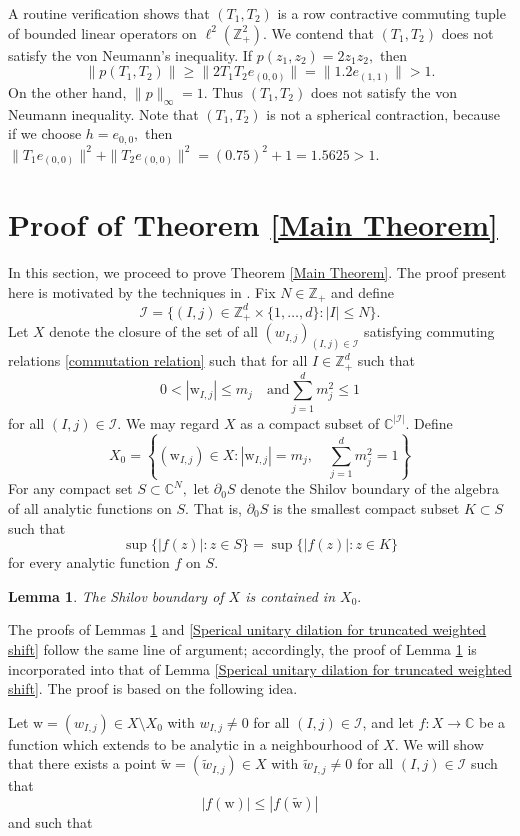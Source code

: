 \documentclass[12pt,reqno] {amsart}
\newtheorem{lemma}{Lemma}
\theoremstyle{remark}
\theoremstyle{definition}
\begin{document}
A routine verification shows that $(T_1,T_2)$ is a row contractive commuting tuple of bounded linear operators on $\ell^2(\mathbb Z_+^2).$
We contend that $(T_1,T_2)$ does not satisfy the von Neumann's inequality. If $p(z_1,z_2)= 2z_1 z_2,$ then
\[ \|p(T_1, T_2)\|\geq \|2T_1T_2e_{(0,0)}\| = \|1.2 e_{(1,1)}\| > 1. \] 
On the other hand, $\|p\|_{ \infty}=1$. Thus $(T_1,T_2)$ does not satisfy the von Neumann inequality. Note that $(T_1,T_2)$ is not a spherical contraction, because if we choose $h=e_{0,0},$ then $\|T_1e_{(0,0)}\|^2 +\| T_2e_{(0,0)}\|^2 = (0.75)^2+1 = 1.5625 > 1.$

\section{Proof of Theorem \ref{Main Theorem}}
In this section, we proceed to prove  Theorem \ref{Main Theorem}.
The proof present here is motivated by the techniques in \cite{Hz}.
Fix \( N \in \mathbb{Z}_+ \) and define
\[
\mathcal{I} = \{ (I,j) \in \mathbb{Z}_+^d \times \{1, \dots, d\} : |I| \leq N \}.
\]
Let \( X \) denote the closure of the set of all \( ({w}_{I,j})_{(I,j) \in \mathcal{I}} \) satisfying commuting relations \eqref{commutation relation} such that for all $I\in\mathbb{Z}_+^d$ such that
\[
0 <  |\mathrm{w}_{I,j}| \leq m_j  \quad  \text{and} \sum_{j=1}^d m_j^2 \leq1
\]
for all \( (I,j) \in \mathcal{I} \). We may regard \( X \) as a compact subset of \( \mathbb{C}^{|\mathcal{I}|} \). Define
\[
X_0 = \left\{ (\mathrm{w}_{I,j}) \in X : 
 |\mathrm{w}_{I,j}| = m_j,\quad
\sum_{j=1}^d m_j^2 = 1 
\right\}
\]
For any compact set $S \subset \mathbb{C}^N,$ let $\partial_0 S$ denote the Shilov boundary of the algebra of all analytic functions on $S$. That is, $\partial_0 S$ is the smallest compact subset $K \subset S$ such that 
\[
\sup\{|f(z)| : z \in S\} = \sup\{|f(z)| : z \in K\}
\]
for every analytic function $f$ on $S$.

\begin{lemma}\label{Shilov}
The Shilov boundary of \( X \) is contained in $X_0.$
\end{lemma}
The proofs of Lemmas \ref{Shilov} and \ref{Sperical unitary dilation for truncated weighted shift} follow the same line of argument; accordingly, the proof of Lemma \ref{Shilov} is incorporated into that of Lemma \ref{Sperical unitary dilation for truncated weighted shift}. The proof is based on the following idea.

Let \( \mathrm{w} = (w_{I,j}) \in X \setminus X_0 \) with \( w_{I,j} \neq 0 \) for all \( (I, j) \in \mathcal{I} \), and let
\( f : X \to \mathbb{C} \) be a function which extends to be analytic in a neighbourhood of \( X \).
We will show that there exists a point \(\tilde{ \mathrm{w}} = (\tilde{w}_{I,j}) \in X \) with \( \tilde{w}_{I,j} \neq 0 \) for all \( (I, j) \in \mathcal{I} \) such that
\[
|f(\mathrm{w})| \leq |f(\tilde{\mathrm{w}})|
\]
and such that
\end{document}
